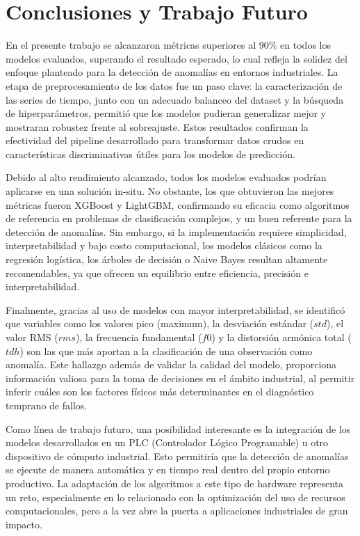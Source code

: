 \documentclass[11pt,a4paper,spanish]{book}
\numberwithin{equation}{chapter}
\numberwithin{figure}{chapter}
\begin{document}
\chapter{Conclusiones y Trabajo Futuro}

En el presente  trabajo se alcanzaron métricas superiores al 90\% en todos los modelos
evaluados, superando el resultado esperado, lo cual refleja la solidez del enfoque 
planteado para la detección de anomalías en entornos industriales. La etapa de 
preprocesamiento de los datos fue un paso clave: la caracterización de las series de 
tiempo, junto con un adecuado balanceo del dataset y la búsqueda de hiperparámetros, 
permitió que los modelos pudieran generalizar mejor y mostraran robustez frente al 
sobreajuste. Estos resultados confirman la efectividad del pipeline desarrollado para 
transformar datos crudos en características discriminativas útiles para los modelos 
de predicción.


Debido al alto rendimiento alcanzado, todos los modelos evaluados podrían aplicarse en 
una solución in-situ. No obstante, los que obtuvieron las mejores métricas fueron 
XGBoost y LightGBM, confirmando su eficacia como algoritmos de referencia en problemas
de clasificación complejos, y un buen referente para la detección de anomalías. Sin 
embargo, si la implementación requiere simplicidad, interpretabilidad y bajo costo 
computacional, los modelos clásicos como la regresión logística, los árboles de decisión
o Naive Bayes resultan altamente recomendables, ya que ofrecen un equilibrio entre 
eficiencia, precisión e interpretabilidad.


Finalmente, gracias al uso de modelos con mayor interpretabilidad, se identificó que 
variables como los valores pico (maximum), la desviación estándar ($std$), el valor RMS ($rms$),
la frecuencia fundamental ($f0$) y la distorsión armónica total ($tdh$) son las que más 
aportan a la clasificación de una observación como anomalía. Este hallazgo  además de 
validar la calidad del modelo, proporciona información valiosa para la toma de 
decisiones en el ámbito industrial, al permitir inferir cuáles son los factores físicos
más determinantes en el diagnóstico temprano de fallos.


Como línea de trabajo futuro, una posibilidad interesante es la integración de los 
modelos desarrollados en un PLC (Controlador Lógico Programable) u otro dispositivo
de cómputo industrial. Esto permitiría que la detección de anomalías se ejecute de 
manera automática y en tiempo real dentro del propio entorno productivo. La adaptación
de los algoritmos a este tipo de hardware representa un reto, especialmente en lo 
relacionado con la optimización del uso de recursos computacionales, pero a la vez abre
la puerta a aplicaciones industriales de gran impacto.
\end{document}
